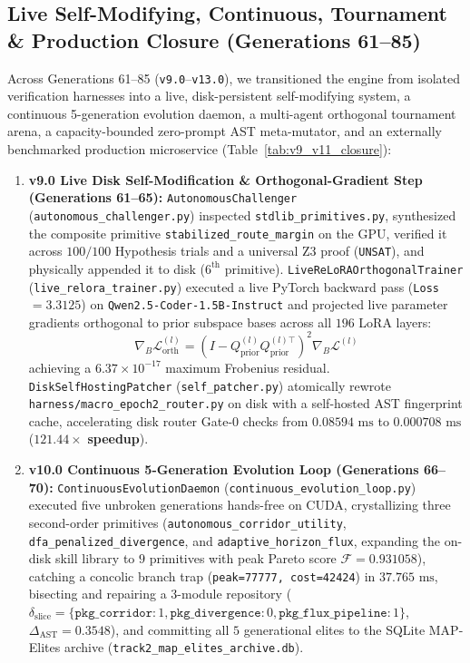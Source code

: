 \documentclass[10pt,twocolumn,letterpaper]{article}
\begin{document}
\subsection{Live Self-Modifying, Continuous, Tournament \& Production Closure (Generations 61--85)}
Across Generations 61--85 (\texttt{v9.0}--\texttt{v13.0}), we transitioned the engine from isolated verification harnesses into a live, disk-persistent self-modifying system, a continuous 5-generation evolution daemon, a multi-agent orthogonal tournament arena, a capacity-bounded zero-prompt AST meta-mutator, and an externally benchmarked production microservice (Table~\ref{tab:v9_v11_closure}):
\begin{enumerate}
    \item \textbf{v9.0 Live Disk Self-Modification \& Orthogonal-Gradient Step (Generations 61--65):} \texttt{Autonomous\allowbreak Challenger} (\texttt{autonomous\_\allowbreak challenger.py}) inspected \texttt{stdlib\_\allowbreak primitives.py}, synthesized the composite primitive \texttt{stabilized\_\allowbreak route\_\allowbreak margin} on the GPU, verified it across $100/100$ Hypothesis trials and a universal Z3 proof (\texttt{UNSAT}), and physically appended it to disk ($6^{\text{th}}$ primitive). \texttt{LiveReLoRA\allowbreak Orthogonal\allowbreak Trainer} (\texttt{live\_\allowbreak relora\_\allowbreak trainer.py}) executed a live PyTorch backward pass (\texttt{Loss}$=3.3125$) on \texttt{Qwen2.5-Coder-1.5B-Instruct} and projected live parameter gradients orthogonal to prior subspace bases across all $196$ LoRA layers:
    \begin{equation}
    \nabla_{B} \mathcal{L}_{\text{orth}}^{(l)} = \left(I - Q_{\text{prior}}^{(l)} Q_{\text{prior}}^{(l)\top}\right)^{2} \nabla_{B} \mathcal{L}^{(l)}
    \end{equation}
    achieving a $6.37\times 10^{-17}$ maximum Frobenius residual. \texttt{DiskSelfHosting\allowbreak Patcher} (\texttt{self\_\allowbreak patcher.py}) atomically rewrote \texttt{harness/\allowbreak macro\_\allowbreak epoch2\_\allowbreak router.py} on disk with a self-hosted AST fingerprint cache, accelerating disk router Gate-0 checks from $0.08594\text{ ms}$ to $0.000708\text{ ms}$ ($\mathbf{121.44\times}$ \textbf{speedup}).
    \item \textbf{v10.0 Continuous 5-Generation Evolution Loop (Generations 66--70):} \texttt{Continuous\allowbreak Evolution\allowbreak Daemon} (\texttt{continuous\_\allowbreak evolution\_\allowbreak loop.py}) executed five unbroken generations hands-free on CUDA, crystallizing three second-order primitives (\texttt{autonomous\_\allowbreak corridor\_\allowbreak utility}, \texttt{dfa\_\allowbreak penalized\_\allowbreak divergence}, and \texttt{adaptive\_\allowbreak horizon\_\allowbreak flux}, expanding the on-disk skill library to $9$ primitives with peak Pareto score $\mathcal{F}=0.931058$), catching a concolic branch trap (\texttt{peak=77777, cost=42424}) in $37.765\text{ ms}$, bisecting and repairing a 3-module repository ($\delta_{\text{slice}}=\{\texttt{pkg\_corridor}: 1, \texttt{pkg\_divergence}: 0, \texttt{pkg\_flux\_pipeline}: 1\}$, $\Delta_{\text{AST}}=0.3548$), and committing all $5$ generational elites to the SQLite MAP-Elites archive (\texttt{track2\_\allowbreak map\_\allowbreak elites\_\allowbreak archive.db}).

\end{enumerate}
\end{document}
